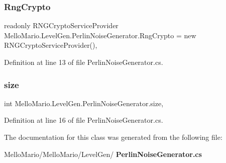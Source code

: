 \subsubsection{Rng\+Crypto}
{\footnotesize\ttfamily readonly R\+N\+G\+Crypto\+Service\+Provider Mello\+Mario.\+Level\+Gen.\+Perlin\+Noise\+Generator.\+Rng\+Crypto = new R\+N\+G\+Crypto\+Service\+Provider()\hspace{0.3cm}{\ttfamily [static]}, {\ttfamily [private]}}



Definition at line 13 of file Perlin\+Noise\+Generator.\+cs.

\mbox{\label{classMelloMario_1_1LevelGen_1_1PerlinNoiseGenerator_a3803334ae1c6240aaeed145d012eb7dd}} 
\subsubsection{size}
{\footnotesize\ttfamily int Mello\+Mario.\+Level\+Gen.\+Perlin\+Noise\+Generator.\+size\hspace{0.3cm}{\ttfamily [static]}, {\ttfamily [private]}}



Definition at line 16 of file Perlin\+Noise\+Generator.\+cs.



The documentation for this class was generated from the following file\+:\begin{DoxyCompactItemize}
\item 
Mello\+Mario/\+Mello\+Mario/\+Level\+Gen/\textbf{ Perlin\+Noise\+Generator.\+cs}\end{DoxyCompactItemize}
